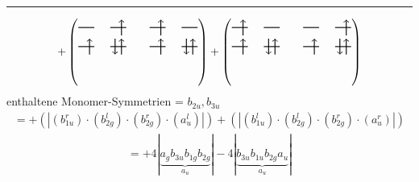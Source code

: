 \documentclass{article}
\begin{document}
\hrule\newpage 
\[ +\left(\text{\begin{tikzpicture}
    \draw[thick] (0,0) -- (0.5,0); %
    \draw[thick] (1,0) -- (1.5,0); %
    \draw[thick] (0,-0.6) -- (0.5,-0.6); %
    \draw[thick] (1,-0.6) -- (1.5,-0.6); %
\draw[->, thick] (1.35, -0.25) -- (1.35, 0.25); 
\draw[-> , thick] (0.35, -0.85) -- (0.35, -0.35); 
 \draw[-> , thick] (1.35, -0.85) -- (1.35, -0.35); 
\draw[<- , thick] (1.15, -0.85) -- (1.15, -0.35); 
\end{tikzpicture}\qquad \begin{tikzpicture}
    \draw[thick] (0,0) -- (0.5,0); %
    \draw[thick] (1,0) -- (1.5,0); %
    \draw[thick] (0,-0.6) -- (0.5,-0.6); %
    \draw[thick] (1,-0.6) -- (1.5,-0.6); %
\draw[->, thick] (0.35, -0.25) -- (0.35, 0.25); 
\draw[-> , thick] (0.35, -0.85) -- (0.35, -0.35); 
 \draw[-> , thick] (1.35, -0.85) -- (1.35, -0.35); 
\draw[<- , thick] (1.15, -0.85) -- (1.15, -0.35); 
\end{tikzpicture}}\right)+\left(\text{\begin{tikzpicture}
    \draw[thick] (0,0) -- (0.5,0); %
    \draw[thick] (1,0) -- (1.5,0); %
    \draw[thick] (0,-0.6) -- (0.5,-0.6); %
    \draw[thick] (1,-0.6) -- (1.5,-0.6); %
\draw[->, thick] (0.35, -0.25) -- (0.35, 0.25); 
\draw[-> , thick] (0.35, -0.85) -- (0.35, -0.35); 
 \draw[-> , thick] (1.35, -0.85) -- (1.35, -0.35); 
\draw[<- , thick] (1.15, -0.85) -- (1.15, -0.35); 
\end{tikzpicture}\qquad \begin{tikzpicture}
    \draw[thick] (0,0) -- (0.5,0); %
    \draw[thick] (1,0) -- (1.5,0); %
    \draw[thick] (0,-0.6) -- (0.5,-0.6); %
    \draw[thick] (1,-0.6) -- (1.5,-0.6); %
\draw[->, thick] (1.35, -0.25) -- (1.35, 0.25); 
\draw[-> , thick] (0.35, -0.85) -- (0.35, -0.35); 
 \draw[-> , thick] (1.35, -0.85) -- (1.35, -0.35); 
\draw[<- , thick] (1.15, -0.85) -- (1.15, -0.35); 
\end{tikzpicture}}\right)\]enthaltene Monomer-Symmetrien = $b_{2u},b_{3u}$\begin{multline*}=+\left(\left|(b_{1u}^{r}) \cdot (b_{2g}^{l}) \cdot (b_{2g}^{r}) \cdot (a_{u}^{l})\right|\right)+\left(\left|(b_{1u}^{l}) \cdot (b_{2g}^{l}) \cdot (b_{2g}^{r}) \cdot (a_{u}^{r})\right|\right)\end{multline*}
\begin{multline*}
=+4\left|\underbrace{a_{g} b_{3u} b_{1g} b_{2g}}_{a_{u}}\right|-4\left|\underbrace{b_{3u} b_{1u} b_{2g} a_{u}}_{a_{u}}\right|
\end{multline*}
\\\\
\end{document}
